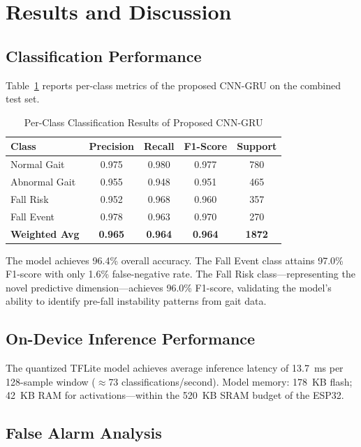 \documentclass[conference]{IEEEtran}
\begin{document}
\section{Results and Discussion}

\subsection{Classification Performance}

Table~\ref{tab:classresults} reports per-class metrics of the proposed CNN-GRU on the combined test set.

\begin{table}[!t]
\caption{Per-Class Classification Results of Proposed CNN-GRU}
\label{tab:classresults}
\centering
\begin{tabular}{|l|c|c|c|c|}
\hline
\textbf{Class} & \textbf{Precision} & \textbf{Recall} & \textbf{F1-Score} & \textbf{Support} \\
\hline
Normal Gait & 0.975 & 0.980 & 0.977 & 780 \\
\hline
Abnormal Gait & 0.955 & 0.948 & 0.951 & 465 \\
\hline
Fall Risk & 0.952 & 0.968 & 0.960 & 357 \\
\hline
Fall Event & 0.978 & 0.963 & 0.970 & 270 \\
\hline
\textbf{Weighted Avg} & \textbf{0.965} & \textbf{0.964} & \textbf{0.964} & \textbf{1872} \\
\hline
\end{tabular}
\end{table}

The model achieves 96.4\% overall accuracy. The Fall Event class attains 97.0\% F1-score with only 1.6\% false-negative rate. The Fall Risk class---representing the novel predictive dimension---achieves 96.0\% F1-score, validating the model's ability to identify pre-fall instability patterns from gait data.

\subsection{On-Device Inference Performance}

The quantized TFLite model achieves average inference latency of 13.7~ms per 128-sample window ($\approx$73 classifications/second). Model memory: 178~KB flash; 42~KB RAM for activations---within the 520~KB SRAM budget of the ESP32.

\subsection{False Alarm Analysis}
\end{document}
